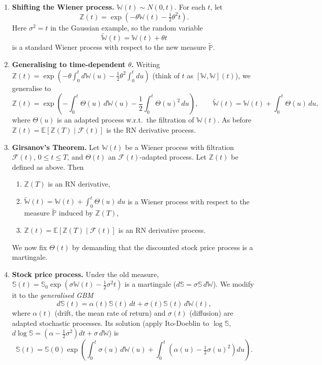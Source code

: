 \begin{enumerate}
    \item \textbf{Shifting the Wiener process.} $\mathbb{W}(t) \sim N(0, t)$. For each $t$, let
    \[\mathbb{Z}(t) = \exp\!\left(-\theta\mathbb{W}(t) - \tfrac{1}{2}\theta^2 t\right).\]
    Here $\sigma^2 = t$ in the Gaussian example, so the random variable
    \[\tilde{\mathbb{W}}(t) = \mathbb{W}(t) + \theta t\]
    is a standard Wiener process with respect to the new measure $\tilde{\mathbb{P}}$.

    \item \textbf{Generalising to time-dependent $\theta$.} Writing $\mathbb{Z}(t) = \exp\!\left(-\theta\int_0^t d\mathbb{W}(u) - \frac{1}{2}\theta^2\int_0^t du\right)$ (think of $t$ as $[\mathbb{W}, \mathbb{W}](t)$), we generalise to
    \[\mathbb{Z}(t) = \exp\!\left(-\int_0^t\Theta(u)\, d\mathbb{W}(u) - \frac{1}{2}\int_0^t\Theta(u)^2\, du\right), \qquad \tilde{\mathbb{W}}(t) = \mathbb{W}(t) + \int_0^t\Theta(u)\, du,\]
    where $\Theta(u)$ is an adapted process w.r.t.\ the filtration of $\mathbb{W}(t)$. As before $\mathbb{Z}(t) = \mathbb{E}[\mathbb{Z}(T) \mid \mathcal{F}(t)]$ is the RN derivative process.

    \item \textbf{Girsanov's Theorem.} Let $\mathbb{W}(t)$ be a Wiener process with filtration $\mathcal{F}(t)$, $0 \leq t \leq T$, and $\Theta(t)$ an $\mathcal{F}(t)$-adapted process. Let $\mathbb{Z}(t)$ be defined as above. Then
    \begin{enumerate}
        \item $\mathbb{Z}(T)$ is an RN derivative,
        \item $\tilde{\mathbb{W}}(t) = \mathbb{W}(t) + \int_0^t\Theta(u)\, du$ is a Wiener process with respect to the measure $\tilde{\mathbb{P}}$ induced by $\mathbb{Z}(T)$,
        \item $\mathbb{Z}(t) = \mathbb{E}[\mathbb{Z}(T) \mid \mathcal{F}(t)]$ is an RN derivative process.
    \end{enumerate}
    We now fix $\Theta(t)$ by demanding that the discounted stock price process is a martingale.

    \item \textbf{Stock price process.} Under the old measure, $\mathbb{S}(t) = \mathbb{S}_0\exp(\sigma\mathbb{W}(t) - \frac{1}{2}\sigma^2 t)$ is a martingale ($d\mathbb{S} = \sigma\mathbb{S}\, d\mathbb{W}$). We modify it to the \textit{generalised GBM}
    \[d\mathbb{S}(t) = \alpha(t)\mathbb{S}(t)\, dt + \sigma(t)\mathbb{S}(t)\, d\mathbb{W}(t), \tag{$\star$}\]
    where $\alpha(t)$ (drift, the mean rate of return) and $\sigma(t)$ (diffusion) are adapted stochastic processes. Its solution (apply Ito-Doeblin to $\log\mathbb{S}$, $d\log\mathbb{S} = (\alpha - \frac{1}{2}\sigma^2)dt + \sigma\, d\mathbb{W}$) is
    \[\mathbb{S}(t) = \mathbb{S}(0)\exp\!\left(\int_0^t\sigma(u)\, d\mathbb{W}(u) + \int_0^t\left(\alpha(u) - \tfrac{1}{2}\sigma(u)^2\right)du\right).\]


\end{enumerate}
